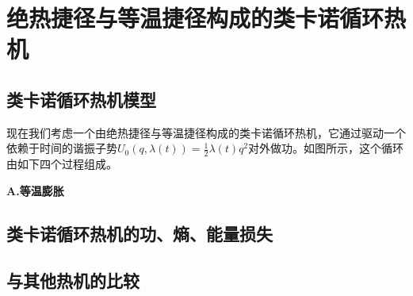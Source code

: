 \chapter{绝热捷径与等温捷径构成的类卡诺循环热机}

\section{类卡诺循环热机模型}

\qquad 现在我们考虑一个由绝热捷径与等温捷径构成的类卡诺循环热机，它通过驱动一个依赖于时间的谐振子势$U_{0}(q, \lambda(t))=\frac{1}{2} \lambda(t) q^{2}$对外做功。如图所示，这个循环由如下四个过程组成。

\begin{center}
    {\bfseries A.等温膨胀}
\end{center}


\section{类卡诺循环热机的功、熵、能量损失}

\section{与其他热机的比较}